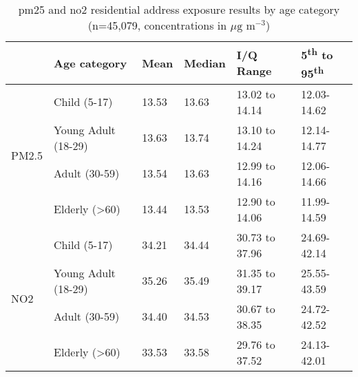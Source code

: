 \begin{table}[H]
\caption{\gls{pm25} and \gls{no2} residential address exposure results by age category (n=45,079, concentrations in $\mu \text{g m}^{-3}$)}
\centering
\begin{tabular}{|l|l|l|l|l|l|}
\hline
                       & \bfseries{Age category}  & \bfseries{Mean}  & \bfseries{Median} & \bfseries{I/Q Range} & \bfseries{5\textsuperscript{th} to 95\textsuperscript{th}} \\ \hline
\multirow{4}{*}{PM2.5} & Child (5-17)             & 13.53 & 13.63 & 13.02 to 14.14    & 12.03-14.62 \\ \cline{2-5} 
                       & Young Adult (18-29)      & 13.63 & 13.74 & 13.10 to 14.24    & 12.14-14.77 \\ \cline{2-5} 
                       & Adult (30-59)            & 13.54 & 13.63 & 12.99 to 14.16    & 12.06-14.66 \\ \cline{2-5} 
                       & Elderly (\textgreater60) & 13.44 & 13.53 & 12.90 to 14.06    & 11.99-14.59 \\ \hline
\multirow{4}{*}{NO2}   & Child (5-17)             & 34.21 & 34.44 & 30.73 to 37.96    & 24.69-42.14 \\ \cline{2-5} 
                       & Young Adult (18-29)      & 35.26 & 35.49 & 31.35 to 39.17    & 25.55-43.59 \\ \cline{2-5} 
                       & Adult (30-59)            & 34.40 & 34.53 & 30.67 to 38.35    & 24.72-42.52 \\ \cline{2-5} 
                       & Elderly (\textgreater60) & 33.53 & 33.58 & 29.76 to 37.52    & 24.13-42.01 \\ \hline
\end{tabular}
\label{tab:address_comparing_age_categories}
\end{table}

